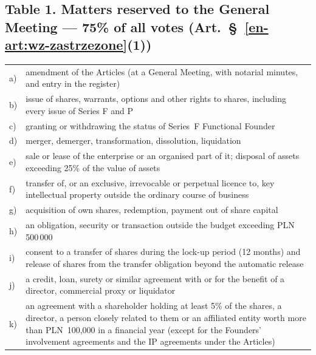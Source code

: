 \documentclass[11pt,a4paper]{report}
\begin{document}
\subsection*{Table 1. Matters reserved to the General Meeting --- 75\% of all votes (Art.~\S~\ref{en-art:wz-zastrzezone}(1))}
\begin{tabularx}{\linewidth}{@{}p{0.6cm} X@{}}
\toprule
a) & amendment of the Articles (at a General Meeting, with notarial minutes, and entry in the register) \\
b) & issue of shares, warrants, options and other rights to shares, including every issue of Series F and P \\
c) & granting or withdrawing the status of Series~F Functional Founder \\
d) & merger, demerger, transformation, dissolution, liquidation \\
e) & sale or lease of the enterprise or an organised part of it; disposal of assets exceeding 25\% of the value of assets \\
f) & transfer of, or an exclusive, irrevocable or perpetual licence to, key intellectual property outside the ordinary course of business \\
g) & acquisition of own shares, redemption, payment out of share capital \\
h) & an obligation, security or transaction outside the budget exceeding PLN 500\,000 \\
i) & consent to a transfer of shares during the lock-up period (12 months) and release of shares from the transfer obligation beyond the automatic release \\
j) & a credit, loan, surety or similar agreement with or for the benefit of a director, commercial proxy or liquidator \\
k) & an agreement with a shareholder holding at least 5\% of the shares, a director, a person closely related to them or an affiliated entity worth more than PLN~100,000 in a financial year (except for the Founders' involvement agreements and the IP agreements under the Articles) \\
\bottomrule
\end{tabularx}

\end{document}
